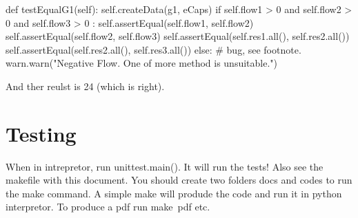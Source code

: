 \documentclass[10pt,a4paper]{article}%
\begin{document}
\nwenddocs{}\endmoddef\nwstartdeflinemarkup\nwenddeflinemarkup
def testEqualG1(self):
    self.createData(g1, eCaps)
    if self.flow1 > 0 and self.flow2 > 0 and self.flow3 > 0 : 
        self.assertEqual(self.flow1, self.flow2)
        self.assertEqual(self.flow2, self.flow3)
        self.assertEqual(self.res1.all(), self.res2.all())
        self.assertEqual(self.res2.all(), self.res3.all())
    else:
       # bug, see footnote.
       warn.warn("Negative Flow. One of more method is unsuitable.")

\nwendcode{}And ther reulst is 24 (which is right).

\nwenddocs{}\section{Testing}

    When in intrepretor, run {\Tt{}unittest.main()\nwendquote}. It will run the tests! Also see
    the {\Tt{}makefile\nwendquote} with this document. You should create two folders {\Tt{}docs\nwendquote} and
    {\Tt{}codes\nwendquote} to run the make command. A simple {\Tt{}make\nwendquote} will produde the code and
    run it in python interpretor. To produce a pdf run {\Tt{}make\ pdf\nwendquote} etc.

\nwenddocs{}\nwdocspar
\nowebindex
\nowebchunks
\end{document}
